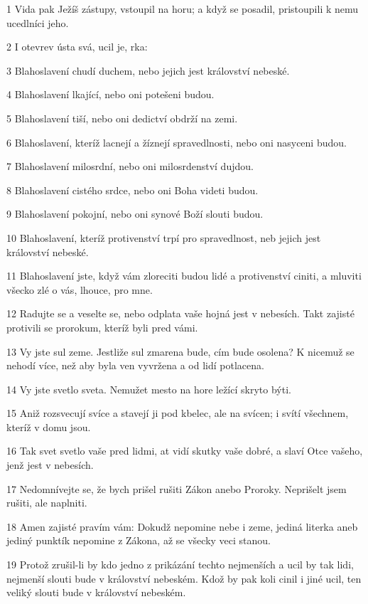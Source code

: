 \par 1 Vida pak Ježíš zástupy, vstoupil na horu; a když se posadil, pristoupili k nemu ucedlníci jeho.
\par 2 I otevrev ústa svá, ucil je, rka:
\par 3 Blahoslavení chudí duchem, nebo jejich jest království nebeské.
\par 4 Blahoslavení lkající, nebo oni potešeni budou.
\par 5 Blahoslavení tiší, nebo oni dedictví obdrží na zemi.
\par 6 Blahoslavení, kteríž lacnejí a žíznejí spravedlnosti, nebo oni nasyceni budou.
\par 7 Blahoslavení milosrdní, nebo oni milosrdenství dujdou.
\par 8 Blahoslavení cistého srdce, nebo oni Boha videti budou.
\par 9 Blahoslavení pokojní, nebo oni synové Boží slouti budou.
\par 10 Blahoslavení, kteríž protivenství trpí pro spravedlnost, neb jejich jest království nebeské.
\par 11 Blahoslavení jste, když vám zloreciti budou lidé a protivenství ciniti, a mluviti všecko zlé o vás, lhouce, pro mne.
\par 12 Radujte se a veselte se, nebo odplata vaše hojná jest v nebesích. Takt zajisté protivili se prorokum, kteríž byli pred vámi.
\par 13 Vy jste sul zeme. Jestliže sul zmarena bude, cím bude osolena? K nicemuž se nehodí více, než aby byla ven vyvržena a od lidí potlacena.
\par 14 Vy jste svetlo sveta. Nemužet mesto na hore ležící skryto býti.
\par 15 Aniž rozsvecují svíce a stavejí ji pod kbelec, ale na svícen; i svítí všechnem, kteríž v domu jsou.
\par 16 Tak svet svetlo vaše pred lidmi, at vidí skutky vaše dobré, a slaví Otce vašeho, jenž jest v nebesích.
\par 17 Nedomnívejte se, že bych prišel rušiti Zákon anebo Proroky. Neprišelt jsem rušiti, ale naplniti.
\par 18 Amen zajisté pravím vám: Dokudž nepomine nebe i zeme, jediná literka aneb jediný punktík nepomine z Zákona, až se všecky veci stanou.
\par 19 Protož zrušil-li by kdo jedno z prikázání techto nejmenších a ucil by tak lidi, nejmenší slouti bude v království nebeském. Kdož by pak koli cinil i jiné ucil, ten veliký slouti bude v království nebeském.
